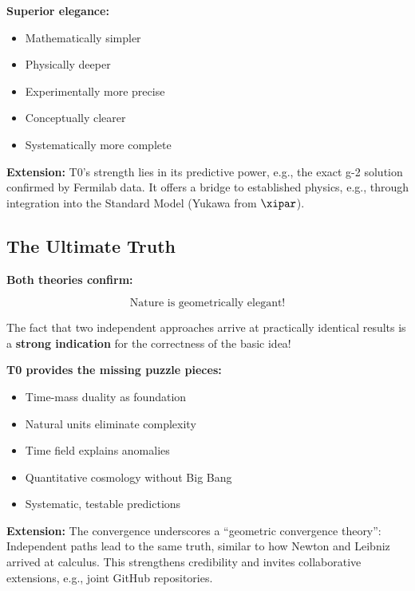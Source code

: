 	\textbf{Superior elegance:}
	\begin{itemize}
		\item Mathematically simpler
		\item Physically deeper
		\item Experimentally more precise
		\item Conceptually clearer
		\item Systematically more complete
	\end{itemize}
	
	\textbf{Extension:} T0's strength lies in its predictive power, e.g., the exact g-2 solution confirmed by Fermilab data. It offers a bridge to established physics, e.g., through integration into the Standard Model (Yukawa from $\xipar$).
	
	\subsection{The Ultimate Truth}
	
	\begin{gemeinsam}
		\textbf{Both theories confirm:}
		
		\begin{equation}
			\boxed{\text{Nature is geometrically elegant!}}
		\end{equation}
		
		The fact that two independent approaches arrive at practically identical results is a \textbf{strong indication} for the correctness of the basic idea!
		
		\textbf{T0 provides the missing puzzle pieces:}
		\begin{itemize}
			\item Time-mass duality as foundation
			\item Natural units eliminate complexity
			\item Time field explains anomalies
			\item Quantitative cosmology without Big Bang
			\item Systematic, testable predictions
		\end{itemize}
		
		\textbf{Extension:} The convergence underscores a ``geometric convergence theory'': Independent paths lead to the same truth, similar to how Newton and Leibniz arrived at calculus. This strengthens credibility and invites collaborative extensions, e.g., joint GitHub repositories.
	\end{gemeinsam}
	
